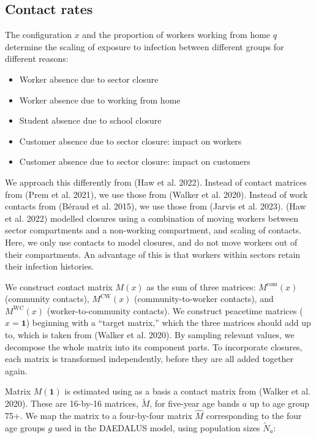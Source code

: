 \documentclass[
]{article}
\providecommand{\tightlist}{%
  \setlength{\itemsep}{0pt}\setlength{\parskip}{0pt}}
\begin{document}
\hypertarget{contact-rates}{%
\subsection{Contact rates}\label{contact-rates}}

The configuration \(x\) and the proportion of workers working from home \(q\) determine the scaling of exposure to infection between different groups for different reasons:

\begin{itemize}
\tightlist
\item
  Worker absence due to sector closure
\item
  Worker absence due to working from home
\item
  Student absence due to school closure
\item
  Customer absence due to sector closure: impact on workers
\item
  Customer absence due to sector closure: impact on customers
\end{itemize}

We approach this differently from (Haw et al. 2022). Instead of contact matrices from (Prem et al. 2021), we use those from (Walker et al. 2020). Instead of work contacts from (Béraud et al. 2015), we use those from (Jarvis et al. 2023). (Haw et al. 2022) modelled closures using a combination of moving workers between sector compartments and a non-working compartment, and scaling of contacts. Here, we only use contacts to model closures, and do not move workers out of their compartments. An advantage of this is that workers within sectors retain their infection histories.

We construct contact matrix \(M(x)\) as the sum of three matrices: \(M^{\text{com}}(x)\) (community contacts), \(M^{\text{CW}}(x)\) (community-to-worker contacts), and \(M^{\text{WC}}(x)\) (worker-to-community contacts). We construct peacetime matrices (\(x=\textbf{1}\)) beginning with a ``target matrix,'' which the three matrices should add up to, which is taken from (Walker et al. 2020). By sampling relevant values, we decompose the whole matrix into its component parts. To incorporate closures, each matrix is transformed independently, before they are all added together again.

Matrix \(M(\textbf{1})\) is estimated using as a basis a contact matrix from (Walker et al. 2020). These are 16-by-16 matrices, \(\tilde{M}\), for five-year age bands \(a\) up to age group 75+. We map the matrix to a four-by-four matrix \(\hat{M}\) corresponding to the four age groups \(g\) used in the DAEDALUS model, using population sizes \(\tilde{N}_a\):
\end{document}
